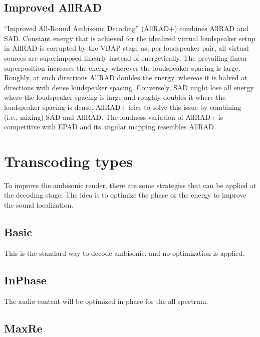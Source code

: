 \documentclass[
  letterpaper,
  DIV=11,
  numbers=noendperiod]{scrreport}
\begin{document}
\hypertarget{improved-allrad}{%
\subsection{Improved AllRAD}\label{improved-allrad}}

``Improved All-Round Ambisonic Decoding'' (AllRAD+) combines AllRAD and
SAD. Constant energy that is achieved for the idealized virtual
loudspeaker setup in AllRAD is corrupted by the VBAP stage as, per
loudspeaker pair, all virtual sources are superimposed linearly instead
of energetically. The prevailing linear superposition increases the
energy wherever the loudspeaker spacing is large. Roughly, at such
directions AllRAD doubles the energy, whereas it is halved at directions
with dense loudspeaker spacing. Conversely, SAD might lose all energy
where the loudspeaker spacing is large and roughly doubles it where the
loudspeaker spacing is dense. AllRAD+ tries to solve this issue by
combining (i.e., mixing) SAD and AllRAD. The loudness variation of
AllRAD+ is competitive with EPAD and its angular mapping resembles
AllRAD.

\hypertarget{transcoding-types}{%
\section{Transcoding types}\label{transcoding-types}}

To improve the ambisonic render, there are some strategies that can be
applied at the decoding stage. The idea is to optimize the phase or the
energy to improve the sound localization.

\hypertarget{basic}{%
\subsection{Basic}\label{basic}}

This is the standard way to decode ambisonic, and no optimization is
applied.

\hypertarget{inphase}{%
\subsection{InPhase}\label{inphase}}

The audio content will be optimized in phase for the all spectrum.

\hypertarget{maxre}{%
\subsection{MaxRe}\label{maxre}}
\end{document}
